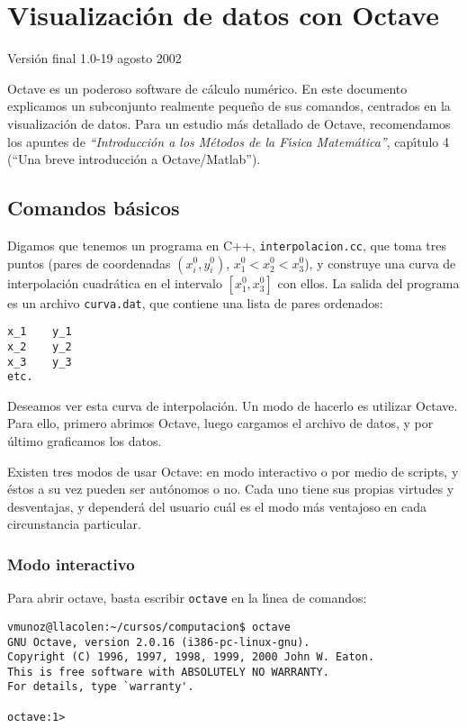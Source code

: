 \documentclass[12pt]{article}
\begin{document}
\section{Visualizaci\'on de datos con Octave}

\hfill{\tiny Versi\'on final 1.0-19 agosto 2002}

Octave es un poderoso software de c\'alculo num\'erico. 
En este documento explicamos un subconjunto realmente peque\~no de
sus comandos, centrados en la visualizaci\'on de datos. Para un
estudio m\'as detallado de Octave, recomendamos 
los apuntes de {\it ``Introducci\'on a los M\'etodos de la F\'{\i}sica
  Matem\'atica''}, cap\'{\i}tulo 4
 (``Una breve introducci\'on a Octave/Matlab''). 

\subsection{Comandos b\'asicos}

Digamos que tenemos un programa en C++, \verb+interpolacion.cc+, que
toma tres puntos (pares de coordenadas $(x^0_i,y^0_i)$, $x^0_1<x^0_2<x^0_3$), 
y construye una curva
de interpolaci\'on cuadr\'atica en el intervalo $[x^0_1,x^0_3]$ con
ellos. La salida del programa es un archivo \verb+curva.dat+, que
contiene una lista de pares ordenados:
\begin{verbatim}
x_1    y_1
x_2    y_2
x_3    y_3
etc.
\end{verbatim}
Deseamos ver esta curva de interpolaci\'on. Un modo de hacerlo es
utilizar Octave. Para ello, primero abrimos Octave, luego cargamos el
archivo de datos, y por \'ultimo graficamos los datos.

Existen tres modos de usar Octave: en modo interactivo o por medio de
scripts, y \'estos a su vez pueden ser aut\'onomos o no. Cada uno
tiene sus propias virtudes y desventajas, y depender\'a del usuario
cu\'al es el modo m\'as ventajoso en cada circunstancia particular.

\subsubsection{Modo interactivo}

Para abrir octave, basta escribir \verb+octave+ en la l\'{\i}nea de comandos:
\begin{verbatim}
vmunoz@llacolen:~/cursos/computacion$ octave
GNU Octave, version 2.0.16 (i386-pc-linux-gnu).
Copyright (C) 1996, 1997, 1998, 1999, 2000 John W. Eaton.
This is free software with ABSOLUTELY NO WARRANTY.
For details, type `warranty'.

octave:1> 
\end{verbatim}
\end{document}
